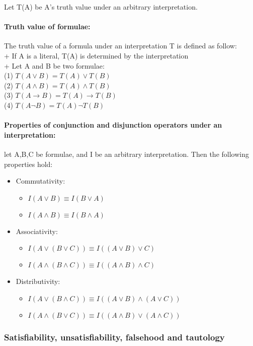 \documentclass[part1.tex]{subfiles}
\begin{document}
Let T(A) be A's truth value under an arbitrary interpretation.\\
\paragraph{Truth value of formulae:} The truth value of a formula
under an interpretation T is defined as follow:\\
\indent + If A is a literal, T(A) is determined by the interpretation\\
\indent + Let A and B be two formulae:\\
\indent \indent (1) \(T(A\vee B) = T(A) \vee T(B)\)\\
\indent \indent (2) \(T(A\wedge B) = T(A) \wedge T(B)\)\\
\indent \indent (3) \(T(A\to B) = T(A) \to T(B)\)\\
\indent \indent (4) \(T(A\neg B) = T(A) \neg T(B)\)
\paragraph{Properties of conjunction and disjunction operators
under an interpretation:} let A,B,C be formulae, and I be an
arbitrary interpretation. Then the following properties hold:
\begin{itemize}
\item Commutativity:
  \begin{itemize}
    \item $I(A \vee B) \equiv I(B \vee A)$
    \item $I(A \wedge B) \equiv I(B \wedge A)$
  \end{itemize}
\item Associativity:
  \begin{itemize}
    \item $I(A \vee (B \vee C)) \equiv I((A \vee B) \vee C)$
    \item $I(A \wedge (B \wedge C)) \equiv I((A \wedge B) \wedge C)$
  \end{itemize}
\item Distributivity:
  \begin{itemize}
    \item $I(A \vee (B \wedge C)) \equiv I((A \vee B) \wedge (A \vee
      C))$
    \item $I(A \wedge (B \vee C)) \equiv I((A \wedge B) \vee (A \wedge
      C))$
  \end{itemize}
\end{itemize}
\subsubsection{Satisfiability, unsatisfiability, falsehood and
tautology}
\end{document}
